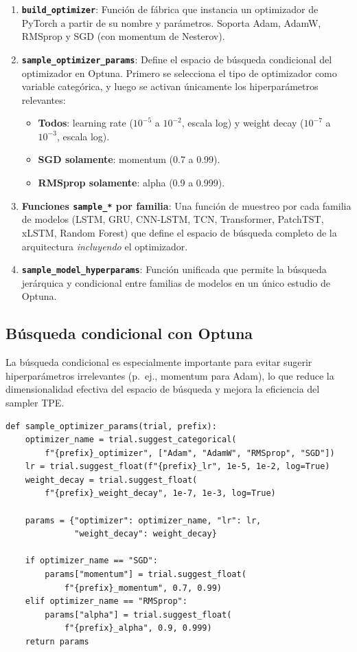 \documentclass[12pt, a4paper]{article}
\newcommand{\code}[1]{\texttt{#1}}
\begin{document}
\begin{enumerate}
    \item \textbf{\code{build\_optimizer}}: Función de fábrica que instancia un optimizador de PyTorch a partir de su nombre y parámetros. Soporta Adam, AdamW, RMSprop y SGD (con momentum de Nesterov).

    \item \textbf{\code{sample\_optimizer\_params}}: Define el espacio de búsqueda condicional del optimizador en Optuna. Primero se selecciona el tipo de optimizador como variable categórica, y luego se activan únicamente los hiperparámetros relevantes:
    \begin{itemize}
        \item \textbf{Todos}: learning rate ($10^{-5}$ a $10^{-2}$, escala log) y weight decay ($10^{-7}$ a $10^{-3}$, escala log).
        \item \textbf{SGD solamente}: momentum (0.7 a 0.99).
        \item \textbf{RMSprop solamente}: alpha (0.9 a 0.999).
    \end{itemize}

    \item \textbf{Funciones \code{sample\_*} por familia}: Una función de muestreo por cada familia de modelos (LSTM, GRU, CNN-LSTM, TCN, Transformer, PatchTST, xLSTM, Random Forest) que define el espacio de búsqueda completo de la arquitectura \emph{incluyendo} el optimizador.

    \item \textbf{\code{sample\_model\_hyperparams}}: Función unificada que permite la búsqueda jerárquica y condicional entre familias de modelos en un único estudio de Optuna.
\end{enumerate}

\subsection{Búsqueda condicional con Optuna}

La búsqueda condicional es especialmente importante para evitar sugerir hiperparámetros irrelevantes (p.~ej., momentum para Adam), lo que reduce la dimensionalidad efectiva del espacio de búsqueda y mejora la eficiencia del sampler TPE.

\begin{lstlisting}[caption={Búsqueda condicional de optimizador en Optuna.}, label={lst:conditional_search}]
def sample_optimizer_params(trial, prefix):
    optimizer_name = trial.suggest_categorical(
        f"{prefix}_optimizer", ["Adam", "AdamW", "RMSprop", "SGD"])
    lr = trial.suggest_float(f"{prefix}_lr", 1e-5, 1e-2, log=True)
    weight_decay = trial.suggest_float(
        f"{prefix}_weight_decay", 1e-7, 1e-3, log=True)

    params = {"optimizer": optimizer_name, "lr": lr,
              "weight_decay": weight_decay}

    if optimizer_name == "SGD":
        params["momentum"] = trial.suggest_float(
            f"{prefix}_momentum", 0.7, 0.99)
    elif optimizer_name == "RMSprop":
        params["alpha"] = trial.suggest_float(
            f"{prefix}_alpha", 0.9, 0.999)
    return params
\end{lstlisting}
\end{document}

